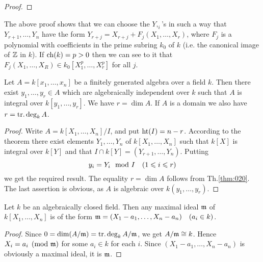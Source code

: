 \documentclass[../main]{subfiles}
\begin{document}
\begin{proof}
\end{proof}

\begin{remark}
The above proof shows that we can choose the $Y,_i$'s in such a way that $Y_{r+1},\ldots,Y_n$ have the form $Y_{r+j}=X_{r+j}+F_j(X_1,\ldots,X_r)$, where $F_j$ is a polynomial with coefficients in the prime subring $k_0$ of $k$ (i.e. the canonical image of $\mathbb{Z}$ in $k$). If $\operatorname{ch}(k) = p > 0$ then we can see to it that\newline  $F_j(X_1,\ldots,X_R)\in k_0[X_1^p,\ldots,X_r^p]$ for all $j$.
\end{remark}

\begin{parcorollary}\label{cor:14.03}
Let \newline $A = k[x_1,\ldots,x_n]$ be a finitely generated algebra over a field $k$. Then there exist $y_1,\ldots,y_r\in A$ which are algebraically independent over $k$ such that $A$ is integral over $k[y_1,\ldots,y_r]$. We have $r = \dim A$. If $A$ is a domain we also have $r=\operatorname{tr. deg}_kA$.
\end{parcorollary}

\begin{proof}
Write $A = k[X_1,\ldots,X_n]/I$, and put $\operatorname{ht}(I) =n- r$. According to the theorem there exist elements $Y_1,\ldots,Y_n$ of $k[X_1,\ldots,X_n]$ such that $k[X]$ is integral over $k[Y]$ and that $I\cap k[Y] = (Y_{r+1},\ldots,Y_n)$. Putting \[y_i = Y_i \mod I\for{1\leqslant i\leqslant r}\] we get the required result. The equality $r = \dim A$ follows from Th.\ref{thm:020}. The last assertion is obvious, as $A$ is algebraic over $k(y_1,\ldots,y_r)$.
\end{proof}

\begin{corollary}\label{cor:14.04}
Let $k$ be an algebraically closed field. Then any maximal ideal $\mathfrak{m}$ of $k[X_1,\ldots,X_n]$ is of the form $\ideal{m} = (X_1-a_1,\ldots,X_n-a_n)\for{a_i\in k}$.
\end{corollary}

\begin{proof}
Since $0 = \operatorname{dim}(A/\mathfrak{m}) = \operatorname{tr. deg}_kA/\mathfrak{m}$, we get $A/\mathfrak{m}\cong k$. Hence \newline $X_i = a_i\pmod{\mathfrak{m}}$ for some $a_i\in k$ for each $i$. Since $(X_1-a_1,\ldots,X_n-a_n)$ is obviously a maximal ideal, it is $\mathfrak{m}$.
\end{proof}
\end{document}
